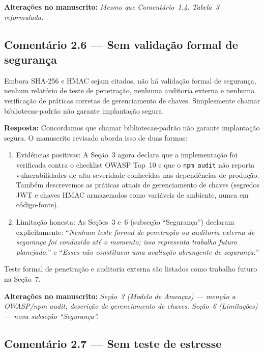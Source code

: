 \documentclass[11pt,a4paper]{article}
\newcommand{\response}[1]{\par\noindent\textcolor{responsecolor}{\textbf{Resposta:}} #1}
\newcommand{\change}[1]{\par\noindent\textcolor{changecolor}{\textbf{Alterações no manuscrito:}} \textit{#1}}
\begin{document}
\change{Mesmo que Comentário~1.4. Tabela~3 reformulada.}

\bigskip

\subsection*{Comentário 2.6 --- Sem validação formal de segurança}

\begin{reviewerbox}
Embora SHA-256 e HMAC sejam citados, não há validação formal de segurança, nenhum relatório de teste de penetração, nenhuma auditoria externa e nenhuma verificação de práticas corretas de gerenciamento de chaves. Simplesmente chamar bibliotecas-padrão não garante implantação segura.
\end{reviewerbox}

\response{Concordamos que chamar bibliotecas-padrão não garante implantação segura. O manuscrito revisado aborda isso de duas formas:}

\begin{enumerate}[nosep]
  \item Evidências positivas: A Seção~3 agora declara que a implementação foi verificada contra o checklist OWASP Top~10 e que o \texttt{npm audit} não reporta vulnerabilidades de alta severidade conhecidas nas dependências de produção. Também descrevemos as práticas atuais de gerenciamento de chaves (segredos JWT e chaves HMAC armazenados como variáveis de ambiente, nunca em código-fonte).
  \item Limitação honesta: As Seções~3 e~6 (subseção ``Segurança'') declaram explicitamente: ``\textit{Nenhum teste formal de penetração ou auditoria externa de segurança foi conduzido até o momento; isso representa trabalho futuro planejado.}'' e ``\textit{Esses não constituem uma avaliação abrangente de segurança.}''
\end{enumerate}

Teste formal de penetração e auditoria externa são listados como trabalho futuro na Seção~7.

\change{Seção~3 (Modelo de Ameaças) --- menção a OWASP/npm audit, descrição de gerenciamento de chaves. Seção~6 (Limitações) --- nova subseção ``Segurança''.}

\bigskip

\subsection*{Comentário 2.7 --- Sem teste de estresse}
\end{document}
